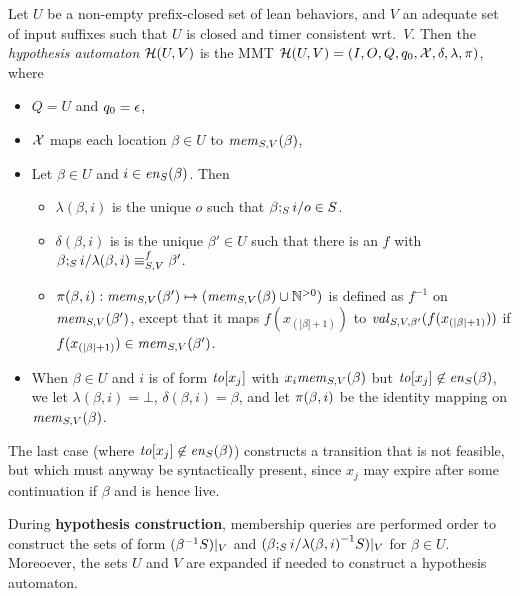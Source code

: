\begin{definition}
\label{def:hypo}
  Let $U$ be a non-empty prefix-closed set of lean behaviors,
  and $V$ an adequate set of input suffixes such that
  $U$ is closed and timer consistent wrt.\ $V$. Then the
{\em hypothesis automaton} $\hypoof UV$ is the MMT
$\hypoof UV = (I, O, Q, q_0, \vars, \delta, \lambda, \remap)$, where
\begin{itemize}
\item $Q = U$ and $q_0 = \emptyword$,
\item $\vars$ maps each location $\beta\in U$ to $\apprgetmemorable{S}{\beta}{V}$,
\item Let $\beta \in U$ and $i \in \feasibleinputs{\beta}{S}$. Then
  \begin{itemize}
    \item $\lambda(\beta,i)$ is
     the unique $o$ such that $\extend{\beta}{i}{o} \in S$. 
    \item $\delta(\beta,i)$ is is
        the unique $\beta' \in U$ such that there is an $f$ with
  $\extend{\beta}{i}{\lambda(\beta,i)} \equiv_{S,V}^f \beta'$.
      \item $\remap(\beta,i):\apprgetmemorable{S}{\beta'}{V} \mapsto (\apprgetmemorable{S}{\beta}{V} \cup \natplus)$ is defined as $f^{-1}$ on
        $\apprgetmemorable{S}{\beta'}{V}$, except that it maps
        $f(x_{(|\beta|+1)})$ to
        $\apprgetassignment{S}{\beta'}{V}(f(x_{(|\beta|+1)}))$
        if $f(x_{(|\beta|+1)}) \in \apprgetmemorable{S}{\beta'}{V}$.
  \end{itemize}
\item When $\beta \in U$ and $i$ is of form $\toevent{x_j}$ with
  $x_i \apprgetmemorable{S}{\beta}{V}$ but
  $\toevent{x_j} \not\in\feasibleinputs{\beta}{S}$, we let
  $\lambda(\beta,i) = \bot$, 
  $\delta(\beta,i) = \beta$, and let
  $\remap(\beta,i)$ be the identity mapping on $\apprgetmemorable{S}{\beta}{V}$.
\end{itemize}
\end{definition}
The last case (where  $\toevent{x_j} \not\in\feasibleinputs{\beta}{S}$)
constructs a transition that is not feasible,
but which must anyway be syntactically present, since $x_j$
may expire after some continuation if $\beta$ and is hence live.

 During {\bf hypothesis construction}, membership queries are performed order
 to construct the sets of form $\apprsuffixbehs{S}{\beta}{V}$ and
 $\apprsuffixbehs{S}{\extend{\beta}{i}{\lambda(\beta,i)}}{V}$ for $\beta \in U$.
 Moreoever, the sets $U$ and $V$ are expanded if needed to construct
 a hypothesis automaton.

